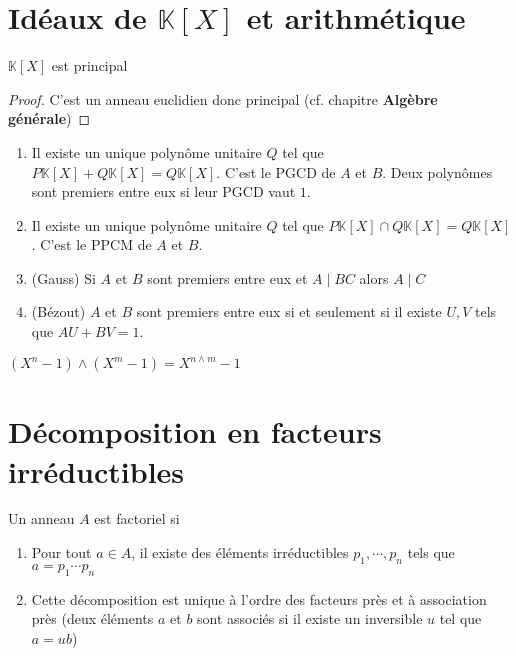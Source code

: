 \section{Idéaux de {$\mathbb K[X]$} et arithmétique}

\begin{thm}
    $\mathbb K[X]$ est principal
\end{thm}
\begin{proof}
    C'est un anneau euclidien donc principal (cf. chapitre \textbf{Algèbre générale})
\end{proof}

\begin{thmdef}
    \begin{enumerate}
        \item Il existe un unique polynôme unitaire $Q$ tel que $P\mathbb K[X]+Q\mathbb K[X]=Q\mathbb K[X]$. C'est le PGCD de $A$ et $B$. Deux polynômes sont premiers entre eux si leur PGCD vaut $1$.
        \item Il existe un unique polynôme unitaire $Q$ tel que $P\mathbb K[X]\cap Q\mathbb K[X]=Q\mathbb K[X]$. C'est le PPCM de $A$ et $B$.
        \item (Gauss)  Si $A$ et $B$ sont premiers entre eux et $A\;|\;BC$ alors $A\;|\;C$
        \item (Bézout)  $A$ et $B$ sont premiers entre eux si et seulement si il existe $U, V$ tels que $AU+BV=1$.
    \end{enumerate}
\end{thmdef}

\begin{ex}
    $(X^n-1)\land (X^m-1)=X^{n\land m}-1$
\end{ex}

\section{Décomposition en facteurs irréductibles}

\begin{dfn}
    Un anneau $A$ est factoriel si \begin{enumerate}
        \item Pour tout $a\in A$, il existe des éléments irréductibles $p_1, \cdots, p_n$ tels que $a=p_1\cdots p_n$
        \item Cette décomposition est unique à l'ordre des facteurs près et à association près (deux éléments $a$ et $b$ sont associés si il existe un inversible $u$ tel que $a=ub$)
    \end{enumerate}
\end{dfn}

